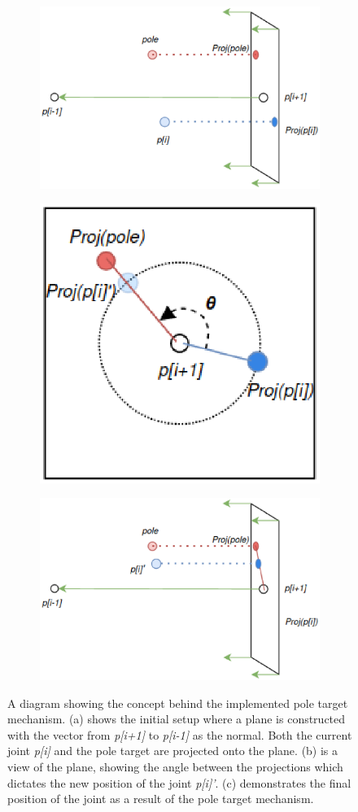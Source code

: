 \begin{figure}
    \centering
    \captionsetup{justification=centering}
    \begin{subfigure}{\textwidth}
        \centering
        \includegraphics[width=0.6\linewidth]{grafika/pole_start.eps}
        \subcaption{}
        \label{fig:pole_start}
    \end{subfigure}
    \begin{subfigure}{\textwidth}
        \centering
        \includegraphics[width=0.3\linewidth]{grafika/pole_projection.eps}
        \subcaption{}
        \label{fig:pole_projection}
    \end{subfigure}
    \begin{subfigure}{\textwidth}
        \centering
        \includegraphics[width=0.6\linewidth]{grafika/pole_end.eps}
        \subcaption{}
        \label{fig:pole_end}
    \end{subfigure}
    \caption{A diagram showing the concept behind the implemented pole target
    mechanism. (a) shows the initial setup where a plane is constructed with the
    vector from \textit{p[i+1]} to \textit{p[i-1]} as the normal. Both the
    current joint \textit{p[i]} and the pole target are projected onto the
    plane. (b) is a view of the plane, showing the angle between the
    projections which dictates the new position of the joint \textit{p[i]'}. (c)
    demonstrates the final position of the joint as a result of the pole target
    mechanism.}
    \label{fig:pole_diagram}
\end{figure}

